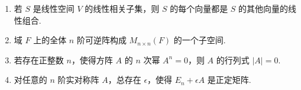 \begin{enumerate}
    \begin{enumerate}[label=(\arabic*)]
        \item 若 $S$ 是线性空间 $V$ 的线性相关子集，则 $S$ 的每个向量都是 $S$ 的其他向量的线性组合.
        \item 域 $F$ 上的全体 $n$ 阶可逆阵构成 $M_{n\times n}(F)$ 的一个子空间.
        \item 若存在正整数 $n$，使得方阵 $A$ 的 $n$ 次幂 $A^n=0$，则 $A$ 的行列式 $\lvert A \rvert = 0.$
        \item 对任意的 $n$ 阶实对称阵 $A$，总存在 $\epsilon$，使得 $E_n+\epsilon A$ 是正定矩阵.
    \end{enumerate}
\end{enumerate}

\newpage

